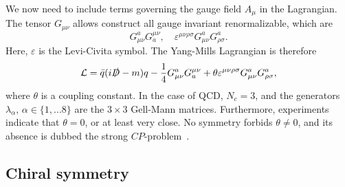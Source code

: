 We now need to include terms governing the gauge field $A_\mu$ in the Lagrangian.
The tensor $G_{\mu\nu}$ allows construct all gauge invariant renormalizable, which are
\begin{equation}
    G_{\mu \nu}^a G_a^{\mu \nu}, 
    \quad 
    \varepsilon^{\mu\nu\rho\sigma} G_{\mu \nu}^a G_{\rho \sigma}^a.
\end{equation}
Here, $\varepsilon$ is the Levi-Civita symbol.
The Yang-Mills Lagrangian is therefore
\begin{equation}
    \mathcal{L} = \bar q ( i \slashed{D} - m)q 
    - \frac{1}{4} G_{\mu \nu}^a G_a^{\mu \nu}
    + \theta \varepsilon^{\mu\nu\rho\sigma} G_{\mu \nu}^a G_{\rho \sigma}^a,
\end{equation}
where $\theta$ is a coupling constant. 
In the case of QCD, $N_c = 3$, and the generators $\lambda_\alpha, \, \alpha \in \{1, ... 8\}$ are the $3\times3$ Gell-Mann matrices.
Furthermore, experiments indicate that $\theta = 0$, or at least very close.
No symmetry forbids $\theta \neq 0$, and its absence is dubbed the strong $CP$-problem~\cite{Schwartz:QFT}.

\subsection*{Chiral symmetry}

